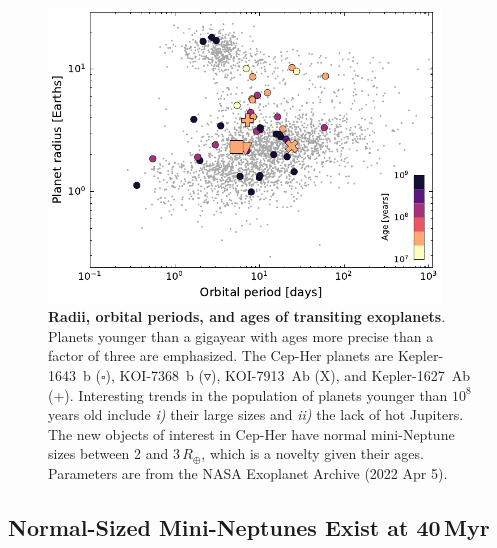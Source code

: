 \documentclass[12pt,twocolumn,tighten,linenumbers]{aastex63}
\begin{document}
\begin{figure}[!t]
	\begin{center}
		\leavevmode
		\includegraphics[width=0.93\textwidth]{f4.pdf}
	\end{center}
	\vspace{-0.6cm}
	\caption{
		{\bf Radii, orbital periods, and ages of transiting exoplanets}.
    Planets younger than a gigayear with ages more precise than a
    factor of three are emphasized. The Cep-Her planets are
    Kepler-1643~b ($\square$), KOI-7368~b ($\triangledown$),
    KOI-7913~Ab (X), and Kepler-1627~Ab (+).  Interesting trends in
    the population of planets younger than $10^8$ years old include {\it i)} their
    large sizes and {\it ii)} the lack of hot Jupiters.  The new
    objects of interest in Cep-Her have normal mini-Neptune sizes
    between 2 and 3\,$R_\oplus$, which is a novelty given their ages.
    Parameters are from the NASA Exoplanet Archive (2022 Apr 5).
		\label{fig:rp_period_age}
	}
\end{figure}


\subsection{Normal-Sized Mini-Neptunes Exist at 40$\,$Myr}
\label{subsec:sizes}
\end{document}
